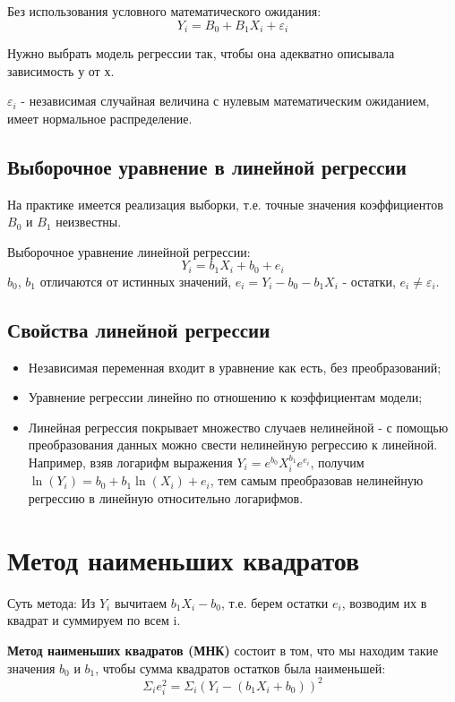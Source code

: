 \documentclass{article}
\begin{document}
Без использования условного математического ожидания:
\[Y_i = B_0 + B_1X_i + \varepsilon_i\]

Нужно выбрать модель регрессии так, чтобы она адекватно описывала зависимость у от х.

\(\varepsilon_i\) - независимая случайная величина с нулевым математическим ожиданием, имеет нормальное распределение.

\subsection{Выборочное уравнение в линейной регрессии}
На практике имеется реализация выборки, т.е. точные значения коэффициентов \(B_0\) и \(B_1\) неизвестны.

Выборочное уравнение линейной регрессии:
\[Y_i = b_1X_i + b_0 + e_i\]
\(b_0\), \(b_1\) отличаются от истинных значений, \(e_i = Y_i - b_0 - b_1X_i \) - остатки,  \(e_i \neq \varepsilon_i \).

\subsection{Свойства линейной регрессии}\label{sec:prop}
\begin{itemize}
    \item Независимая переменная входит в уравнение как есть, без преобразований;
    \item Уравнение регрессии линейно по отношению к коэффициентам модели;
    \item Линейная регрессия покрывает множество случаев нелинейной - с помощью преобразования данных можно свести нелинейную регрессию к линейной. Например, взяв логарифм выражения \(Y_i = e^{b_0}X_i^{b_1}e^{e_i}\), получим \(\ln(Y_i) = b_0 + b_1\ln(X_i) + e_i\), тем самым преобразовав нелинейную регрессию в линейную относительно логарифмов.
\end{itemize}
    

\section{Метод наименьших квадратов}\label{sec:mnk}
Суть метода: Из \(Y_i\) вычитаем \(b_1X_i - b_0\), т.е. берем остатки \(e_i\), возводим их в квадрат и суммируем по всем i.

\textbf{Метод наименьших квадратов (МНК)} состоит в том, что мы находим такие значения \(b_0\) и \(b_1\), чтобы сумма квадратов остатков была наименьшей: 
\[\Sigma_ie_i^2 = \Sigma_i(Y_i - (b_1X_i + b_0))^2\]
\end{document}
